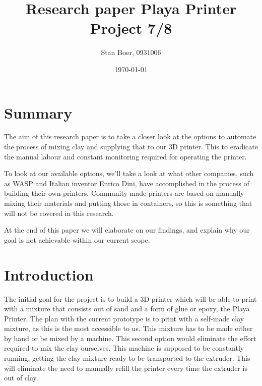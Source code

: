 \documentclass[12pt, a4paper]{article}
\title{\textbf{Research paper Playa Printer\\Project 7/8}}
\author{Stan Boer, 0931006}
\date{\today}
\begin{document}
	\clearpage
	\maketitle
	\thispagestyle{empty}
	\newpage

	\setcounter{page}{1}
	\newpage
	
\section{Summary}
The aim of this research paper is to take a closer look at the options to automate the process of mixing clay and supplying that to our 3D printer. This to eradicate the manual labour and constant monitoring required for operating the printer.

To look at our available options, we'll take a look at what other companies, such as WASP and Italian inventor Enrico Dini, have accomplished in the process of building their own printers. Community made printers are based on manually mixing their materials and putting those in containers, so this is something that will not be covered in this research.

At the end of this paper we will elaborate on our findings, and explain why our goal is not achievable within our current scope.
	\newpage
	
	\tableofcontents
	\newpage
	
\section{Introduction}
The initial goal for the project is to build a 3D printer which will be able to print with a mixture that consists out of sand and a form of glue or epoxy, the Playa Printer. The plan with the current prototype is to print with a self-made clay mixture, as this is the most accessible to us. This mixture has to be made either by hand or be mixed by a machine. This second option would eliminate the effort required to mix the clay ourselves. This machine is supposed to be constantly running, getting the clay mixture ready to be transported to the extruder. This will eliminate the need to manually refill the printer every time the extruder is out of clay.
\end{document}
